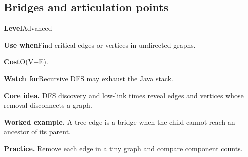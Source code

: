 \documentclass[10pt,letterpaper]{article}
\newcommand{\entrylabel}[1]{\textcolor{accent}{\bfseries #1}}
\begin{document}
\subsection{Bridges and articulation points}
\begin{guidebox}\small
\entrylabel{Level}\quad Advanced\par
\entrylabel{Use when}\quad Find critical edges or vertices in undirected graphs.\par
\entrylabel{Cost}\quad O(V+E).\par
\entrylabel{Watch for}\quad Recursive DFS may exhaust the Java stack.\par
\end{guidebox}
\noindent\textbf{Core idea.} DFS discovery and low-link times reveal edges and vertices whose removal disconnects a graph.\par
\noindent\textbf{Worked example.} A tree edge is a bridge when the child cannot reach an ancestor of its parent.\par
\noindent\textbf{Practice.} Remove each edge in a tiny graph and compare component counts.\par
\end{document}
